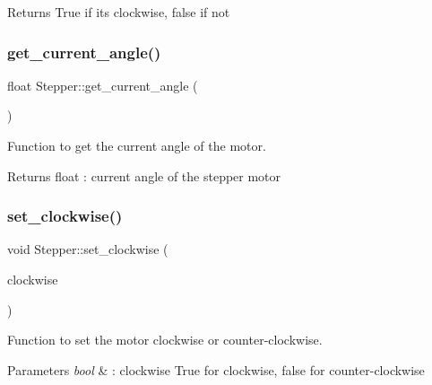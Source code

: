 \begin{DoxyReturn}{Returns}
True if it\textquotesingle{}s clockwise, false if not 
\end{DoxyReturn}
\mbox{\label{class_stepper_aa784ae1f9988bb3fb853b9cda8ec3d42}} 
\subsubsection{\texorpdfstring{get\+\_\+current\+\_\+angle()}{get\_current\_angle()}}
{\footnotesize\ttfamily float Stepper\+::get\+\_\+current\+\_\+angle (\begin{DoxyParamCaption}{ }\end{DoxyParamCaption})}



Function to get the current angle of the motor. 

\begin{DoxyReturn}{Returns}
float \+: current angle of the stepper motor 
\end{DoxyReturn}
\mbox{\label{class_stepper_afbd27ef66b7c41d7d70849ed2a2eedc5}} 
\subsubsection{\texorpdfstring{set\+\_\+clockwise()}{set\_clockwise()}}
{\footnotesize\ttfamily void Stepper\+::set\+\_\+clockwise (\begin{DoxyParamCaption}\item[{bool}]{clockwise }\end{DoxyParamCaption})}



Function to set the motor clockwise or counter-\/clockwise. 


\begin{DoxyParams}{Parameters}
{\em bool} & \+: clockwise True for clockwise, false for counter-\/clockwise \\
\hline
\end{DoxyParams}
\mbox{\label{class_stepper_af07083ac8e9b0f36c3d2384fa922f7db}} 
